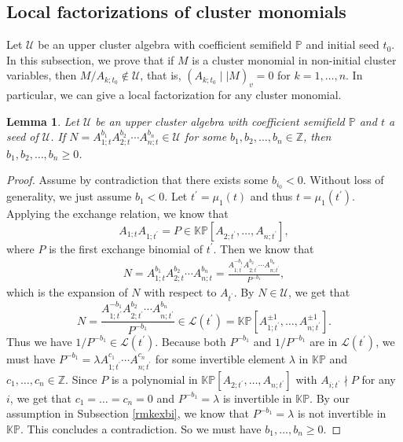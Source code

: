 \documentclass{amsart}
\newtheorem{lemma}[theorem]{Lemma}
\theoremstyle{definition}
\theoremstyle{remark}
\numberwithin{equation}{section}
\begin{document}
\subsection{Local factorizations of cluster monomials}\label{sec52}
Let $\mathcal U$ be an upper cluster algebra with coefficient semifield  $\mathbb P$ and   initial seed $t_0$. In this subsection, we prove that if $M$ is a cluster monomial in non-initial cluster variables, then $M/A_{k;t_0}\notin\mathcal U$, that is, $(A_{k;t_0}\mid\mid M)_v=0$ for $k=1,\ldots,n$. In particular, we can give a local factorization for any cluster monomial.


\begin{lemma}\label{lemmonomial}
Let $\mathcal U$ be an upper cluster algebra with coefficient semifield $\mathbb P$  and $t$ a seed of $\mathcal U$. If $N=A_{1;t}^{b_1}A_{2;t}^{b_2}\cdots A_{n;t}^{b_n}\in\mathcal U$ for some $b_1, b_2,\ldots,b_n\in\mathbb Z$, then $b_1, b_2,\ldots,b_n\geq 0$.
\end{lemma}
\begin{proof}
Assume by contradiction that there exists some $b_{i_0}<0$. Without loss of generality, we just assume $b_1<0$.
Let $t^\prime=\mu_{1}(t)$ and thus $t=\mu_1(t^\prime)$. Applying the exchange relation, we know that
$$A_{1;t}A_{1;t^\prime}=P\in\mathbb{KP}[A_{2;t^\prime},\ldots,A_{n;t^\prime}],$$ where $P$ is the first exchange binomial of $t^\prime$. Then we know that
\begin{eqnarray}
N=A_{1;t}^{b_1}A_{2;t}^{b_2}\cdots A_{n;t}^{b_n}
=\frac{A_{1;t^\prime}^{-b_1}A_{2;t^\prime}^{b_2}\cdots A_{n;t^\prime}^{b_n}}{P^{-b_1}},\nonumber
\end{eqnarray}
which is the expansion of $N$ with respect to $A_{t^\prime}$. By $N\in\mathcal U$, we get that $$N=\frac{A_{1;t^\prime}^{-b_1}A_{2;t^\prime}^{b_2}\cdots A_{n;t^\prime}^{b_n}}{P^{-b_1}}\in\mathcal L(t^\prime)=\mathbb {KP}[A_{1;t^\prime}^{\pm1},\ldots,A_{n;t^\prime}^{\pm1}].$$ Thus we have
$1/P^{-b_1}\in\mathcal L(t^\prime).$
Because both $P^{-b_1}$ and $1/P^{-b_1}$ are in $\mathcal L(t^\prime)$, we must have $P^{-b_1}=\lambda A_{1;t^\prime}^{c_1}\cdots A_{n;t^\prime}^{c_n}$ for some invertible element $\lambda$ in $\mathbb{KP}$ and $c_1,\ldots,c_n\in\mathbb Z$. Since $P$ is a polynomial in $\mathbb{KP}[A_{2;t^\prime},\ldots,A_{n;t^\prime}]$ with $A_{i;t^\prime}\nmid P$ for any $i$, we get that $c_1=\ldots=c_n=0$ and $P^{-b_1}=\lambda$ is invertible in $\mathbb{KP}$.  By our assumption in Subsection \ref{rmkexbi}, we know that  $P^{-b_1}=\lambda$ is not invertible in $\mathbb{KP}$. This concludes a contradiction. So we must have $b_1,\ldots,b_n\geq 0$.
\end{proof}
\end{document}

